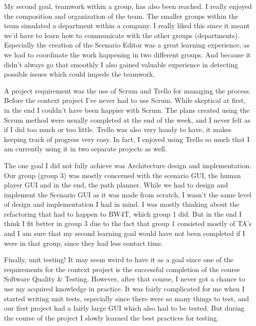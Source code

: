 \documentclass{article}
\begin{document}
\begin{enumerate}
\begin{itemize}
My second goal, teamwork within a group, has also been reached. I really enjoyed the composition and organization of the team. The smaller groups within the team simulated a department within a company. I really liked this since it meant we'd have to learn how to communicate with the other groups (departments). Especially the creation of the Scenario Editor was a great learning experience, as we had to coordinate the work happening in two different groups. And because it didn't always go that smoothly I also gained valuable experience in detecting possible issues which could impede the teamwork. 

A project requirement was the use of Scrum and Trello for managing the process. Before the context project I've never had to use Scrum. While skeptical at first, in the end I couldn't have been happier with Scrum. The plans created using the Scrum method were usually completed at the end of the week, and I never felt as if I did too much or too little. Trello was also very handy to have, it makes keeping track of progress very easy. In fact, I enjoyed using Trello so much that I am currently using it in two separate projects as well.

The one goal I did not fully achieve was Architecture design and implementation. Our group (group 3) was mostly concerned with the scenario GUI, the human player GUI and in the end, the path planner. While we had to design and implement the Scenario GUI as it was made from scratch, I wasn't the same level of design and implementation I had in mind. I was mostly thinking about the refactoring that had to happen to BW4T, which group 1 did. But in the end I think I fit better in group 3 due to the fact that group 1 consisted mostly of TA's and I am sure that my second learning goal would have not been completed if I were in that group, since they had less contact time.

Finally, unit testing! It may seem weird to have it as a goal since one of the requirements for the context project is the successful completion of the course Software Quality \& Testing. However, after that course, I never got a chance to use my acquired knowledge in practice. It was fairly complicated for me when I started writing unit tests, especially since there were so many things to test, and our first project had a fairly large GUI which also had to be tested. But during the course of the project I slowly learned the best practices for testing.



\end{itemize}
\end{enumerate}
\end{document}
